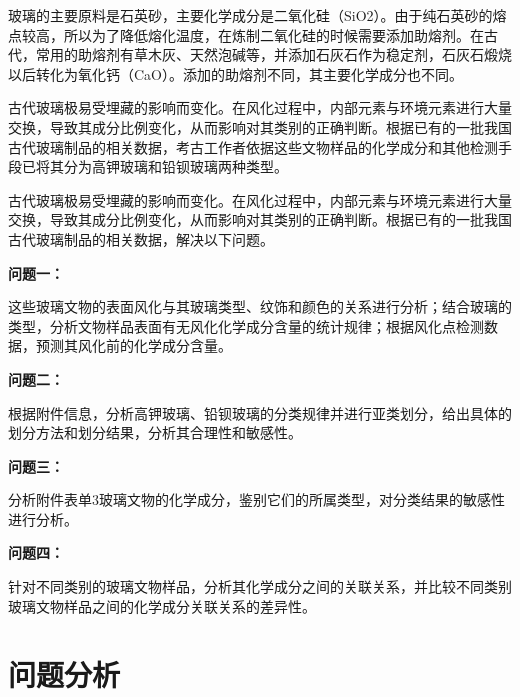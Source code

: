 \documentclass[withoutpreface,bwprint]{cumcmthesis}%
\begin{document}
	玻璃的主要原料是石英砂，主要化学成分是二氧化硅（SiO2）。由于纯石英砂的熔点较高，所以为了降低熔化温度，在炼制二氧化硅的时候需要添加助熔剂。在古代，常用的助熔剂有草木灰、天然泡碱等，并添加石灰石作为稳定剂，石灰石煅烧以后转化为氧化钙（CaO）。添加的助熔剂不同，其主要化学成分也不同。
	
	古代玻璃极易受埋藏的影响而变化。在风化过程中，内部元素与环境元素进行大量交换，导致其成分比例变化，从而影响对其类别的正确判断。根据已有的一批我国古代玻璃制品的相关数据，考古工作者依据这些文物样品的化学成分和其他检测手段已将其分为高钾玻璃和铅钡玻璃两种类型。
	
	古代玻璃极易受埋藏的影响而变化。在风化过程中，内部元素与环境元素进行大量交换，导致其成分比例变化，从而影响对其类别的正确判断。根据已有的一批我国古代玻璃制品的相关数据，解决以下问题。
	
	\begin{flushleft}
	\textbf{问题一：}
	\end{flushleft}
	
	这些玻璃文物的表面风化与其玻璃类型、纹饰和颜色的关系进行分析；结合玻璃的类型，分析文物样品表面有无风化化学成分含量的统计规律；根据风化点检测数据，预测其风化前的化学成分含量。
	

	\begin{flushleft}
	\textbf{问题二：}
	\end{flushleft}

	根据附件信息，分析高钾玻璃、铅钡玻璃的分类规律并进行亚类划分，给出具体的划分方法和划分结果，分析其合理性和敏感性。

	\begin{flushleft}
	\textbf{问题三：}
	\end{flushleft}
	
	分析附件表单3玻璃文物的化学成分，鉴别它们的所属类型，对分类结果的敏感性进行分析。
	
	\begin{flushleft}
	\textbf{问题四：}
	\end{flushleft}

	针对不同类别的玻璃文物样品，分析其化学成分之间的关联关系，并比较不同类别玻璃文物样品之间的化学成分关联关系的差异性。
	
	\section{问题分析}
\end{document}
